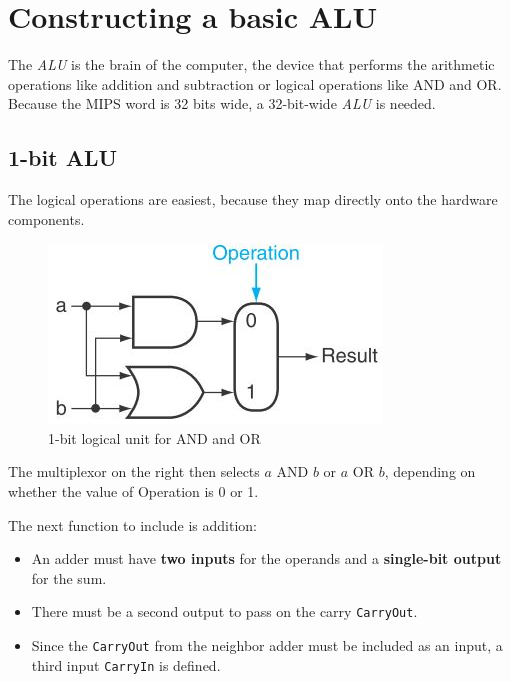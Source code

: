 \documentclass[10pt,a4paper]{article}
\begin{document}
\pagebreak

\section{Constructing a basic ALU}

The \textit{ALU} is the brain of the computer, the device that performs the
arithmetic operations like addition and subtraction or logical operations like AND and OR. Because
the MIPS word is 32 bits wide, a 32-bit-wide \textit{ALU} is needed.

\subsection{1-bit ALU}

The logical operations are easiest, because they map directly onto the hardware components. 
\begin{figure} [h!]
    \centering
    \includegraphics[scale=0.7]{1 bit ALU.JPG}
    \caption{1-bit logical unit for AND and OR}
\end{figure}

The multiplexor on the right then selects $a$ AND $b$ or $a$ OR $b$, depending on whether the value 
of Operation is 0 or 1.

The next function to include is addition:
\begin{itemize}
    \item An adder must have \textbf{two inputs} for the operands and a \textbf{single-bit output} for the sum.
    \item There must be a second output to pass on the carry \texttt{CarryOut}.
    \item Since the \texttt{CarryOut} from the neighbor adder must be included as an input, a third
    input \texttt{CarryIn} is defined.
\end{itemize}  
\end{document}
